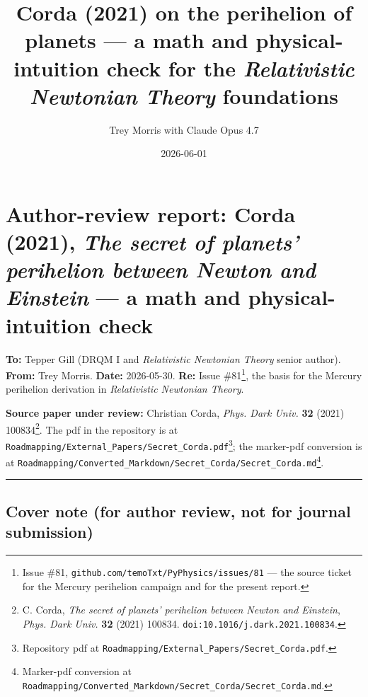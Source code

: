 \documentclass[
  11pt,
]{article}
\title{Corda (2021) on the perihelion of planets --- a math and
physical-intuition check for the \emph{Relativistic Newtonian Theory}
foundations}
\author{Trey Morris with Claude Opus 4.7}
\date{2026-06-01}
\begin{document}
\maketitle

\hypertarget{author-review-report-corda-2021-the-secret-of-planets-perihelion-between-newton-and-einstein-a-math-and-physical-intuition-check}{%
\section{\texorpdfstring{Author-review report: Corda (2021), \emph{The
secret of planets' perihelion between Newton and Einstein} --- a math
and physical-intuition
check}{Author-review report: Corda (2021), The secret of planets' perihelion between Newton and Einstein --- a math and physical-intuition check}}\label{author-review-report-corda-2021-the-secret-of-planets-perihelion-between-newton-and-einstein-a-math-and-physical-intuition-check}}

\textbf{To:} Tepper Gill (DRQM I and \emph{Relativistic Newtonian
Theory} senior author). \textbf{From:} Trey Morris. \textbf{Date:}
2026-05-30. \textbf{Re:} Issue \#81\footnote{Issue \#81,
  \texttt{github.com/temoTxt/PyPhysics/issues/81} --- the source ticket
  for the Mercury perihelion campaign and for the present report.}, the
basis for the Mercury perihelion derivation in \emph{Relativistic
Newtonian Theory}.

\textbf{Source paper under review:} Christian Corda, \emph{Phys. Dark
Univ.} \textbf{32} (2021) 100834\footnote{C. Corda, \emph{The secret of
  planets' perihelion between Newton and Einstein}, \emph{Phys. Dark
  Univ.} \textbf{32} (2021) 100834.
  \texttt{doi:10.1016/j.dark.2021.100834}.}. The pdf in the repository
is at
\texttt{Roadmapping/External\_Papers/Secret\_Corda.pdf}\footnote{Repository
  pdf at \texttt{Roadmapping/External\_Papers/Secret\_Corda.pdf}.}; the
marker-pdf conversion is at
\texttt{Roadmapping/Converted\_Markdown/Secret\_Corda/Secret\_Corda.md}\footnote{Marker-pdf
  conversion at
  \texttt{Roadmapping/Converted\_Markdown/Secret\_Corda/Secret\_Corda.md}.}.

\begin{center}\rule{0.5\linewidth}{0.5pt}\end{center}

\hypertarget{cover-note-for-author-review-not-for-journal-submission}{%
\subsection{Cover note (for author review, not for journal
submission)}\label{cover-note-for-author-review-not-for-journal-submission}}
\end{document}
